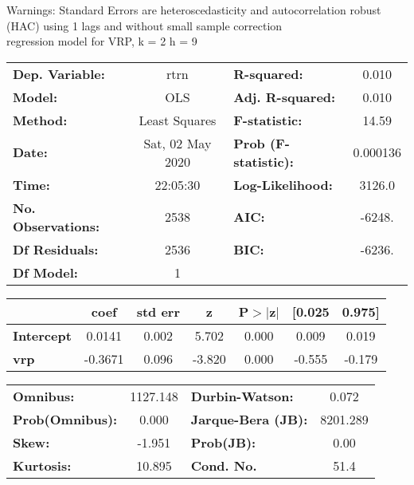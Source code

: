 Warnings: \newline
 [1] Standard Errors are heteroscedasticity and autocorrelation robust (HAC) using 1 lags and without small sample correction\\ 

regression model for VRP, k = 2 h = 9\begin{center}
\begin{tabular}{lclc}
\toprule
\textbf{Dep. Variable:}    &       rtrn       & \textbf{  R-squared:         } &     0.010   \\
\textbf{Model:}            &       OLS        & \textbf{  Adj. R-squared:    } &     0.010   \\
\textbf{Method:}           &  Least Squares   & \textbf{  F-statistic:       } &     14.59   \\
\textbf{Date:}             & Sat, 02 May 2020 & \textbf{  Prob (F-statistic):} &  0.000136   \\
\textbf{Time:}             &     22:05:30     & \textbf{  Log-Likelihood:    } &    3126.0   \\
\textbf{No. Observations:} &        2538      & \textbf{  AIC:               } &    -6248.   \\
\textbf{Df Residuals:}     &        2536      & \textbf{  BIC:               } &    -6236.   \\
\textbf{Df Model:}         &           1      & \textbf{                     } &             \\
\bottomrule
\end{tabular}
\begin{tabular}{lcccccc}
                   & \textbf{coef} & \textbf{std err} & \textbf{z} & \textbf{P$> |$z$|$} & \textbf{[0.025} & \textbf{0.975]}  \\
\midrule
\textbf{Intercept} &       0.0141  &        0.002     &     5.702  &         0.000        &        0.009    &        0.019     \\
\textbf{vrp}       &      -0.3671  &        0.096     &    -3.820  &         0.000        &       -0.555    &       -0.179     \\
\bottomrule
\end{tabular}
\begin{tabular}{lclc}
\textbf{Omnibus:}       & 1127.148 & \textbf{  Durbin-Watson:     } &    0.072  \\
\textbf{Prob(Omnibus):} &   0.000  & \textbf{  Jarque-Bera (JB):  } & 8201.289  \\
\textbf{Skew:}          &  -1.951  & \textbf{  Prob(JB):          } &     0.00  \\
\textbf{Kurtosis:}      &  10.895  & \textbf{  Cond. No.          } &     51.4  \\
\bottomrule
\end{tabular}
\end{center}

